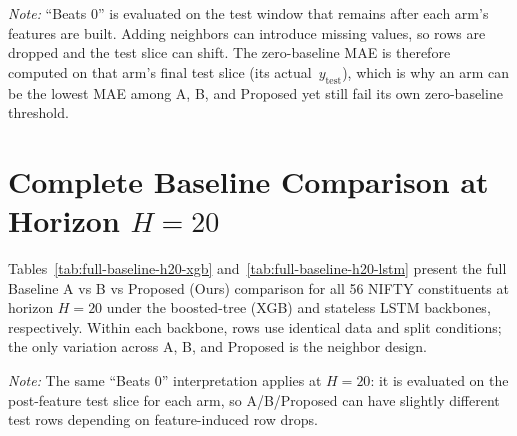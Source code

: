 \documentclass[12pt,a4paper,titlepage]{article}
\begin{document}
\noindent\textit{Note:} ``Beats 0'' is evaluated on the test window that remains after each arm's features are built. Adding neighbors can introduce missing values, so rows are dropped and the test slice can shift. The zero-baseline MAE is therefore computed on that arm's final test slice (its actual \,\(y_{\text{test}}\)), which is why an arm can be the lowest MAE among A, B, and Proposed yet still fail its own zero-baseline threshold.

\section{Complete Baseline Comparison at Horizon \(H=20\)}

Tables~\ref{tab:full-baseline-h20-xgb} and~\ref{tab:full-baseline-h20-lstm} present the full Baseline A vs B vs Proposed (Ours) comparison for all 56 NIFTY constituents at horizon $H=20$ under the boosted-tree (XGB) and stateless LSTM backbones, respectively. Within each backbone, rows use identical data and split conditions; the only variation across A, B, and Proposed is the neighbor design.

\begin{table}[htbp]
\centering
\scriptsize
\caption{Boosted trees (XGB): complete Baseline A vs B vs Proposed at $H=20$ for all 56 constituents. MAE is reported as a percentage of cumulative $20$-day return error. $\checkmark$ = beats zero baseline on that arm's final test rows.}
\label{tab:full-baseline-h20-xgb}
\end{table}

\begin{table}[htbp]
\centering
\scriptsize
\caption{Stateless LSTM: complete Baseline A vs B vs Proposed at $H=20$ for all 56 constituents. MAE is reported as a percentage of cumulative $20$-day return error. $\checkmark$ = beats zero baseline on that arm's final test rows.}
\label{tab:full-baseline-h20-lstm}
\end{table}

\noindent\textit{Note:} The same ``Beats 0'' interpretation applies at $H=20$: it is evaluated on the post-feature test slice for each arm, so A/B/Proposed can have slightly different test rows depending on feature-induced row drops.

\clearpage



\end{document}
